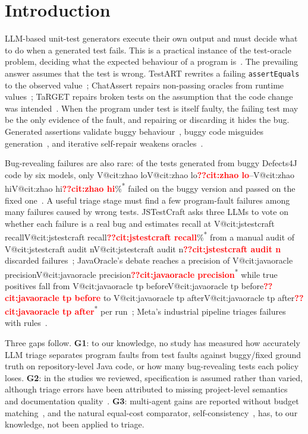 \documentclass[pdflatex,iicol,sn-mathphys-num]{sn-jnl}
\makeatletter
\newcommand{\V}[1]{\ifcsname V@#1\endcsname\csname V@#1\endcsname\else\textbf{\textcolor{red}{??#1}}\fi}
\newcommand{\cited}{\textsuperscript{*}}
\makeatother
\begin{document}

\maketitle

\section{Introduction}\label{sec:intro}

LLM-based unit-test generators execute their own output and must decide what to do when a generated test fails. This is a practical instance of the test-oracle problem, deciding what the expected behaviour of a program is~\cite{barr2015oracle}. The prevailing answer assumes that the test is wrong. TestART rewrites a failing \texttt{assertEquals} to the observed value~\cite{gu2026testart}; ChatAssert repairs non-passing oracles from runtime values~\cite{hayet2025chatassert}; TaRGET repairs broken tests on the assumption that the code change was intended~\cite{yaraghi2025target}. When the program under test is itself faulty, the failing test may be the only evidence of the fault, and repairing or discarding it hides the bug. Generated assertions validate buggy behaviour~\cite{mathews2026validate}, buggy code misguides generation~\cite{zhao2026misguidance}, and iterative self-repair weakens oracles~\cite{li2026selfrepair}.

Bug-revealing failures are also rare: of the tests generated from buggy Defects4J code by six models, only \V{cit:zhao lo}--\V{cit:zhao hi}\%\cited{} failed on the buggy version and passed on the fixed one~\cite{zhao2026misguidance}. A useful triage stage must find a few program-fault failures among many failures caused by wrong tests. JSTestCraft asks three LLMs to vote on whether each failure is a real bug and estimates recall at \V{cit:jstestcraft recall}\%\cited{} from a manual audit of \V{cit:jstestcraft audit n} discarded failures~\cite{liu2026jstestcraft}; JavaOracle's debate reaches a precision of \V{cit:javaoracle precision}\cited{} while true positives fall from \V{cit:javaoracle tp before} to \V{cit:javaoracle tp after}\cited{} per run~\cite{fu2026javaoracle}; Meta's industrial pipeline triages failures with rules~\cite{maddila2026agentic}.

Three gaps follow. \textbf{G1}: to our knowledge, no study has measured how accurately LLM triage separates program faults from test faults against buggy/fixed ground truth on repository-level Java code, or how many bug-revealing tests each policy loses. \textbf{G2}: in the studies we reviewed, specification is assumed rather than varied, although triage errors have been attributed to missing project-level semantics~\cite{liu2026jstestcraft} and documentation quality~\cite{fu2026javaoracle}. \textbf{G3}: multi-agent gains are reported without budget matching~\cite{xie2026maco,xu2026candor,liu2026jstestcraft}, and the natural equal-cost comparator, self-consistency~\cite{wang2023selfconsistency}, has, to our knowledge, not been applied to triage.
\end{document}

